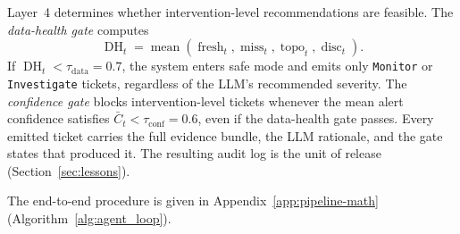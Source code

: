 Layer~4 determines whether intervention-level recommendations are feasible.
The \emph{data-health gate} computes
\begin{equation}
\operatorname{DH}_t
=
\operatorname{mean}
\left(
\operatorname{fresh}_t,
\operatorname{miss}_t,
\operatorname{topo}_t,
\operatorname{disc}_t
\right).
\end{equation}
If $\operatorname{DH}_t<\tau_{\mathrm{data}}=0.7$, the system enters safe
mode and emits only \texttt{Monitor} or \texttt{Investigate} tickets,
regardless of the LLM's recommended severity. The \emph{confidence gate}
blocks intervention-level tickets whenever the mean alert confidence
satisfies $\bar{C}_t<\tau_{\mathrm{conf}}=0.6$, even if the data-health gate
passes. Every emitted ticket carries the full evidence bundle, the LLM
rationale, and the gate states that produced it. The resulting audit log is
the unit of release (Section~\ref{sec:lessons}).

\noindent
The end-to-end procedure is given in Appendix~\ref{app:pipeline-math}
(Algorithm~\ref{alg:agent_loop}).
